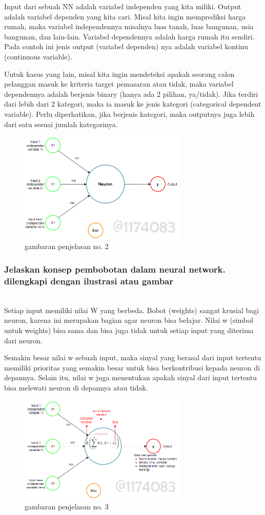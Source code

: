 Input dari sebuah NN adalah variabel independen yang kita miliki. Output adalah variabel dependen yang kita cari. Misal kita ingin memprediksi harga rumah, maka variabel independennya misalnya luas tanah, luas bangunan, usia bangunan, dan lain-lain. Variabel dependennya adalah harga rumah itu sendiri. Pada contoh ini jenis output (variabel dependen) nya adalah variabel kontinu (continuous variable).

Untuk kasus yang lain, misal kita ingin mendeteksi apakah seorang calon pelanggan masuk ke kriteria target pemasaran atau tidak, maka variabel dependennya adalah berjenis binary (hanya ada 2 pilihan, ya/tidak). Jika terdiri dari lebih dari 2 kategori, maka ia masuk ke jenis kategori (categorical dependent variable). Perlu diperhatikan, jika berjenis kategori, maka outputnya juga lebih dari satu sesuai jumlah kategorinya.
\begin{figure}[H]
	\centering
	\includegraphics[width=8cm]{figures/1174083/figures6/2.png}
	\caption{gambaran penjelasan no. 2}
\end{figure}

\subsubsection{Jelaskan konsep pembobotan dalam neural network. dilengkapi dengan ilustrasi atau gambar}
\hfill\\
Setiap input memiliki nilai W yang berbeda. Bobot (weights) sangat krusial bagi neuron, karena ini merupakan bagian agar neuron bisa belajar. Nilai w (simbol untuk weights) bisa sama dan bisa juga tidak untuk setiap input yang diterima dari neuron.

Semakin besar nilai w sebuah input, maka sinyal yang berasal dari input tertentu memiliki prioritas yang semakin besar untuk bisa berkontribusi kepada neuron di depannya. Selain itu, nilai w juga menentukan apakah sinyal dari input tertentu bisa melewati neuron di depannya atau tidak.
\begin{figure}[H]
	\centering
	\includegraphics[width=8cm]{figures/1174083/figures6/3.png}
	\caption{gambaran penjelasan no. 3}
\end{figure}

